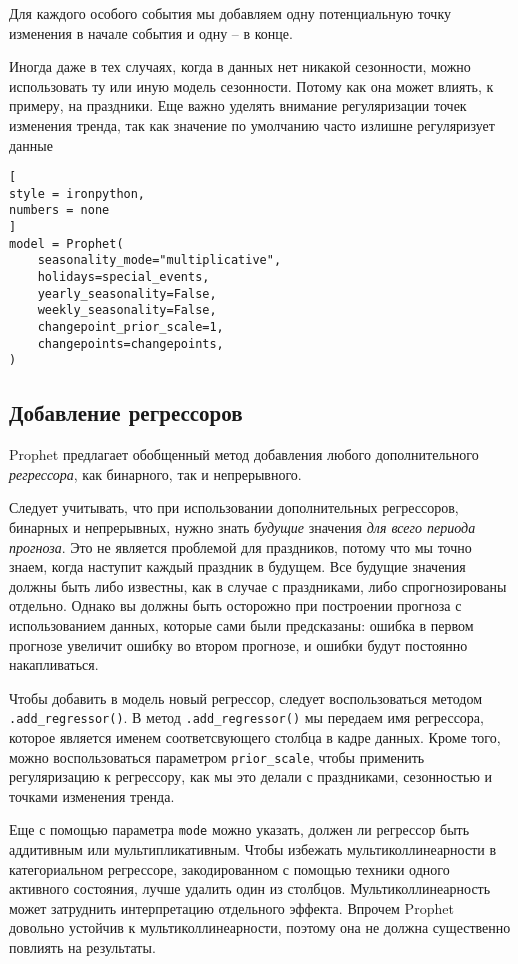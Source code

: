 \documentclass[%
	11pt,
	a4paper,
	utf8,
		]{article}
\begin{document}
Для каждого особого события мы добавляем одну потенциальную точку изменения в начале события и одну -- в конце.

Иногда даже в тех случаях, когда в данных нет никакой сезонности, можно использовать ту или иную модель сезонности. Потому как она может влиять, к примеру, на праздники. Еще важно уделять внимание регуляризации точек изменения тренда, так как значение по умолчанию часто излишне регуляризует данные \cite[]{gruzdev:time-series-2022}
\begin{lstlisting}[
style = ironpython,
numbers = none
]
model = Prophet(
    seasonality_mode="multiplicative",
    holidays=special_events,
    yearly_seasonality=False,
    weekly_seasonality=False,
    changepoint_prior_scale=1,
    changepoints=changepoints,
)
\end{lstlisting}

\subsection{Добавление регрессоров}

Prophet предлагает обобщенный метод добавления любого дополнительного \emph{регрессора}, как бинарного, так и непрерывного.

Следует учитывать, что при использовании дополнительных регрессоров, бинарных и непрерывных, нужно знать \emph{будущие} значения \emph{для всего периода прогноза}. Это не является проблемой для праздников, потому что мы точно знаем, когда наступит каждый праздник в будущем. Все будущие значения должны быть либо известны, как в случае с праздниками, либо спрогнозированы отдельно. Однако вы должны быть осторожно при построении прогноза с использованием данных, которые сами были предсказаны: ошибка в первом прогнозе увеличит ошибку во втором прогнозе, и ошибки будут постоянно накапливаться.

Чтобы добавить в модель новый регрессор, следует воспользоваться методом \verb|.add_regressor()|. В метод \verb|.add_regressor()| мы передаем имя регрессора, которое является именем соответсвующего столбца в кадре данных. Кроме того, можно воспользоваться параметром \verb|prior_scale|, чтобы применить регуляризацию к регрессору, как мы это делали с праздниками, сезонностью и точками изменения тренда.

Еще с помощью параметра \verb|mode| можно указать, должен ли регрессор быть аддитивным или мультипликативным. Чтобы избежать мультиколлинеарности в категориальном регрессоре, закодированном с помощью техники одного активного состояния, лучше удалить один из столбцов. Мультиколлинеарность может затруднить интерпретацию отдельного эффекта. Впрочем Prophet довольно устойчив к мультиколлинеарности, поэтому она не должна существенно повлиять на результаты.
\end{document}
